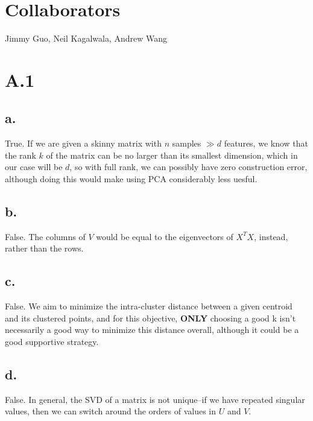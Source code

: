 \documentclass{article}
\date{{}}
\newcommand{\1}{\mathbf{1}}
\begin{document}
\thispagestyle{firstpageheader}

\section*{Collaborators}
{\Large 
Jimmy Guo, Neil Kagalwala, Andrew Wang
}
\section*{A.1}
{\Large 

\subsection*{a.}

True. If we are given a skinny matrix with $n$ samples $\gg d$ features, we know that the rank $k$ of the matrix can be no larger than its smallest dimension, which in our case will be $d$, so with full rank, we can possibly have zero construction error, although doing this would make using PCA considerably less uesful.

\subsection*{b.}

False. The columns of $V$ would be equal to the eigenvectors of $X^T X$, instead, rather than the rows.

\subsection*{c.}

False. We aim to minimize the intra-cluster distance between a given centroid and its clustered points, and for this objective, \textbf{ONLY} choosing a good k isn't necessarily a good  way to minimize this distance overall, although it could be a good supportive strategy. 

\subsection*{d.}

False. In general, the SVD of a matrix is not unique--if we have repeated singular values, then we can switch around the orders of values in $U$ and $V$.

}
\end{document}
